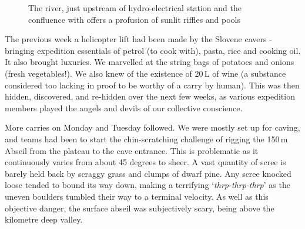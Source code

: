\begin{figure}[t!]
\begin{subfigure}{0.975\textwidth}
\end{subfigure}
\par\bigskip
\begin{subfigure}{\linewidth}
\end{subfigure}
\caption[Zadla\v{z}cica]{The \protect{} river, just upstream of hydro-electrical station and the confluence with \protect{} offers a profusion of sunlit riffles and pools }
\end{figure}


The previous week a helicopter lift had been made by the Slovene cavers - bringing expedition essentials of petrol (to cook with), pasta, rice and cooking oil. It also brought luxuries. We marvelled at the string bags of potatoes and onions (fresh vegetables!). We also knew of the existence of 20\,L of wine (a substance considered too lacking in proof to be worthy of a carry by human). This was then hidden, discovered, and re-hidden over the next few weeks, as various expedition members played the angels and devils of our collective conscience. 

More carries on Monday and Tuesday followed. We were mostly set up for caving, and teams had been to start the chin-scratching challenge of rigging the 150\,m Abseil from the plateau to the cave entrance. This is problematic as it continuously varies from about 45 degrees to sheer. A vast quantity of scree is barely held back by scraggy grass and clumps of dwarf pine. Any scree knocked loose tended to bound its way down, making a terrifying `\emph{thrp-thrp-thrp}' as the uneven boulders tumbled their way to a terminal velocity. As well as this objective danger, the surface abseil was subjectively scary, being above the kilometre deep  valley. 

